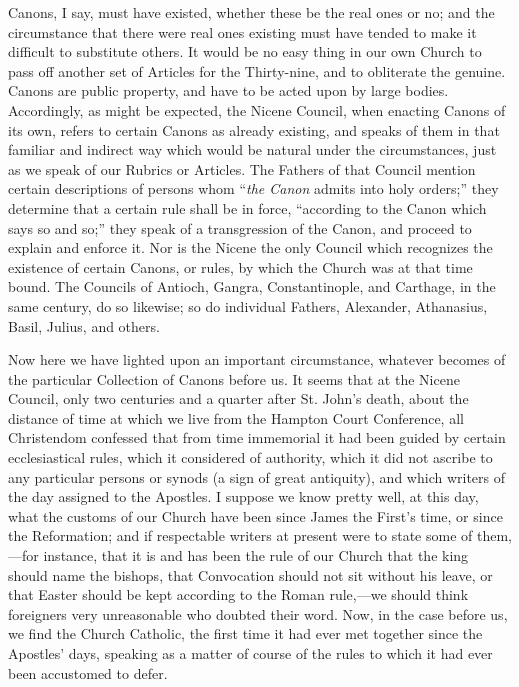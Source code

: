 Canons, I say, must have existed, whether these be the real
ones or no; and the circumstance that there were real ones existing
must have tended to make it difficult to substitute others. It would
be no easy thing in our own Church to pass off another set of Articles
for the Thirty-nine, and to obliterate the genuine. Canons are public
property, and have to be acted upon by large bodies. Accordingly, as
might be expected, the Nicene Council, when enacting Canons of its
own, refers to certain Canons as already existing, and speaks of them
in that familiar and indirect way which would be natural under the
circumstances, just as we speak of our Rubrics or Articles. The
Fathers of that Council mention certain descriptions of persons whom
``\emph{the Canon} admits into holy orders;'' they determine that a
certain rule shall be in force, ``according to the Canon which
says so and so;'' they speak of a transgression of the Canon, and
proceed to explain and enforce it. Nor is the Nicene the only Council
which recognizes the existence of certain Canons, or rules, by which
the Church was at that time bound. The Councils of Antioch, Gangra,
Constantinople, and Carthage, in the same century, do so likewise; so
do individual Fathers, Alexander, Athanasius, Basil, Julius, and
others.

Now here we have lighted upon an important circumstance, whatever
becomes of the particular Collection of Canons before us. It seems
that at the Nicene Council, only two centuries and a quarter after St.
John's death, about the distance of time at which we live from the
Hampton Court Conference, all Christendom confessed that from time
immemorial it had been guided by certain ecclesiastical rules, which
it considered of authority, which it did not ascribe to any particular
persons or synods (a sign of great antiquity), and which writers of
the day assigned to the Apostles. I suppose we know pretty well,
at this day, what the customs of our Church have been since James the
First's time, or since the Reformation; and if respectable writers at
present were to state some of them,—for instance, that it is and has
been the rule of our Church that the king should name the bishops,
that Convocation should not sit without his leave, or that Easter
should be kept according to the Roman rule,—we should think
foreigners very unreasonable who doubted their word. Now, in the case
before us, we find the Church Catholic, the first time it had ever met
together since the Apostles' days, speaking as a matter of course of
the rules to which it had ever been accustomed to defer.

